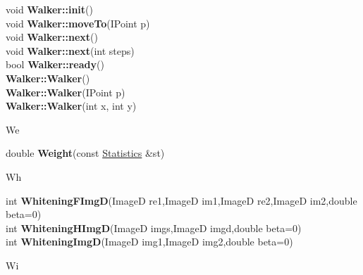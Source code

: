 \documentclass[10pt,titlepage]{article}
\def\functionlistentry#1#2#3#4#5#6{\noindent #1 {\bf #2}(#3) \dotfill #6\\}
\def\letterref#1{}
\def\letterlabel#1{\vspace{0.5cm}\centerline{\Large #1}}
\def\letterlabelend#1{}
\begin{document}
{{\letterref{Wa}
\letterref{We}
\letterref{Wh}
\letterref{Wi}
\letterref{Wr}
\letterref{Ws}
\letterlabelend{Wa}
\functionlistentry{void}{Walker::init}{}{178}{datastructures}{}
\functionlistentry{void}{Walker::moveTo}{IPoint p}{177}{datastructures}{}
\functionlistentry{void}{Walker::next}{}{179}{datastructures}{}
\functionlistentry{void}{Walker::next}{int steps}{180}{datastructures}{}
\functionlistentry{bool}{Walker::ready}{}{181}{datastructures}{}
\functionlistentry{}{Walker::Walker}{}{174}{datastructures}{}
\functionlistentry{}{Walker::Walker}{IPoint p}{175}{datastructures}{}
\functionlistentry{}{Walker::Walker}{int x, int y}{176}{datastructures}{}

\letterlabel{We}
\letterref{A}
\letterref{B}
\letterref{C}
\letterref{D}
\letterref{E}
\letterref{F}
\letterref{G}
\letterref{H}
\letterref{I}
\letterref{K}
\letterref{L}
\letterref{M}
\letterref{N}
\letterref{O}
\letterref{P}
\letterref{Q}
\letterref{R}
\letterref{S}
\letterref{T}
\letterref{U}
\letterref{V}
\letterref{W}
\letterref{X}
\letterref{Y}
\letterref{Z}

\letterref{Wa}
\letterref{We}
\letterref{Wh}
\letterref{Wi}
\letterref{Wr}
\letterref{Ws}
\letterlabelend{We}
\functionlistentry{double}{Weight}{const \hyperlink{Statistics}{Statistics} \&st}{869}{statistics}{}

\letterlabel{Wh}
\letterref{A}
\letterref{B}
\letterref{C}
\letterref{D}
\letterref{E}
\letterref{F}
\letterref{G}
\letterref{H}
\letterref{I}
\letterref{K}
\letterref{L}
\letterref{M}
\letterref{N}
\letterref{O}
\letterref{P}
\letterref{Q}
\letterref{R}
\letterref{S}
\letterref{T}
\letterref{U}
\letterref{V}
\letterref{W}
\letterref{X}
\letterref{Y}
\letterref{Z}

\letterref{Wa}
\letterref{We}
\letterref{Wh}
\letterref{Wi}
\letterref{Wr}
\letterref{Ws}
\letterlabelend{Wh}
\functionlistentry{int}{WhiteningFImgD}{ImageD re1,ImageD im1,ImageD re2,ImageD im2,double beta=0}{1227}{signalTrafo}{}
\functionlistentry{int}{WhiteningHImgD}{ImageD imgs,ImageD imgd,double beta=0}{1228}{signalTrafo}{}
\functionlistentry{int}{WhiteningImgD}{ImageD img1,ImageD img2,double beta=0}{1226}{signalTrafo}{}

\letterlabel{Wi}
\letterref{A}
\letterref{B}
\letterref{C}
\letterref{D}
\letterref{E}
\letterref{F}
\letterref{G}
\letterref{H}
\letterref{I}
\letterref{K}
\letterref{L}
\letterref{M}
\letterref{N}
\letterref{O}
\letterref{P}
\letterref{Q}
\letterref{R}
\letterref{S}
\letterref{T}
\letterref{U}
\letterref{V}
\letterref{W}
\letterref{X}
\letterref{Y}
\letterref{Z}

}}
\end{document}
